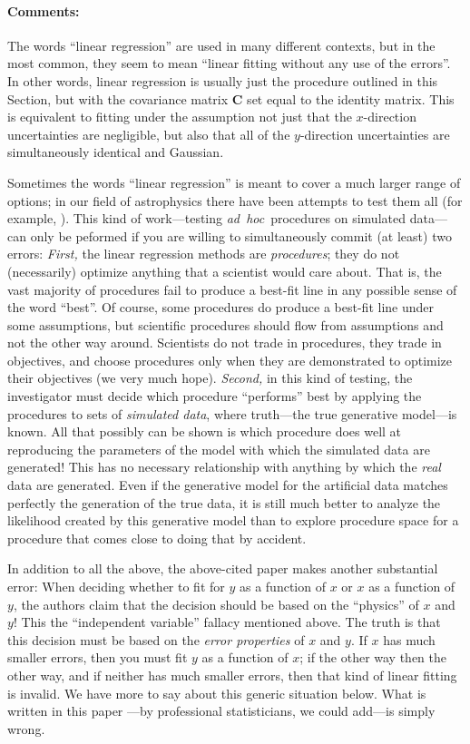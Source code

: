 \documentclass[12pt,twoside]{article}
\newcommand{\notenglish}[1]{\textsl{#1}}
\newcommand{\adhoc}{\notenglish{ad~hoc}}
\newcommand{\sectionname}{Section}
\newcommand{\commentsname}{Comments}
\newenvironment{comments}{\paragraph{\commentsname:}}{}
\newcommand{\mmatrix}[1]{\boldsymbol{#1}}
\newcommand{\mC}{\mmatrix{C}}
\begin{document}
\begin{comments}
The words ``linear regression'' are used in many different contexts,
but in the most common, they seem to mean ``linear fitting without any
use of the errors''.  In other words, linear regression is usually
just the procedure outlined in this \sectionname, but with the
covariance matrix $\mC$ set equal to the identity matrix.  This is
equivalent to fitting under the assumption not just that the
$x$-direction uncertainties are negligible, but also that all of the
$y$-direction uncertainties are simultaneously identical and Gaussian.

Sometimes the words ``linear regression'' is meant to cover a much
larger range of options; in our field of astrophysics there have been
attempts to test them all (for example, \citealt{isobe90}).  This kind
of work---testing \adhoc\ procedures on simulated data---can only be
peformed if you are willing to simultaneously commit (at least) two
errors: \emph{First,} the linear regression methods are
\emph{procedures}; they do not (necessarily) optimize anything that a
scientist would care about. That is, the vast majority of procedures
fail to produce a best-fit line in any possible sense of the word
``best''.  Of course, some procedures do produce a best-fit line under
some assumptions, but scientific procedures should flow from
assumptions and not the other way around.  Scientists do not trade in
procedures, they trade in objectives, and choose procedures only when
they are demonstrated to optimize their objectives (we very much
hope).  \emph{Second,} in this kind of testing, the investigator must
decide which procedure ``performs'' best by applying the procedures to
sets of \emph{simulated data}, where truth---the true generative
model---is known.  All that possibly can be shown is which procedure
does well at reproducing the parameters of the model with which the
simulated data are generated!  This has no necessary relationship with
anything by which the \emph{real} data are generated.  Even if the
generative model for the artificial data matches perfectly the
generation of the true data, it is still much better to analyze the
likelihood created by this generative model than to explore procedure
space for a procedure that comes close to doing that by accident.

In addition to all the above, the above-cited paper \citep{isobe90}
makes another substantial error: When deciding whether to fit for $y$
as a function of $x$ or $x$ as a function of $y$, the authors claim
that the decision should be based on the ``physics'' of $x$ and $y$!
This the ``independent variable'' fallacy mentioned above.  The truth
is that this decision must be based on the \emph{error properties} of
$x$ and $y$. If $x$ has much smaller errors, then you must fit $y$ as
a function of $x$; if the other way then the other way, and if neither
has much smaller errors, then that kind of linear fitting is invalid.
We have more to say about this generic situation below.  What is
written in this paper \citep{isobe90}---by professional statisticians,
we could add---is simply wrong.
\end{comments}
\end{document}
